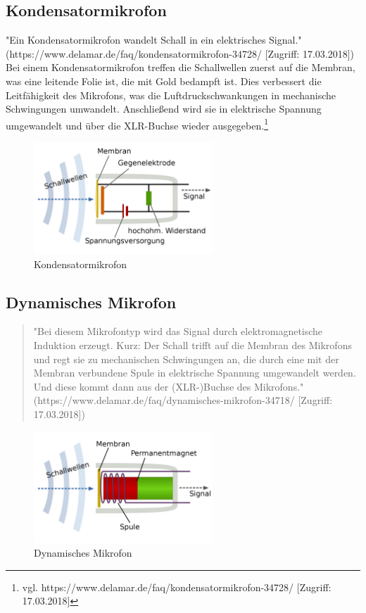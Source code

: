 \subsection{Kondensatormikrofon}
"Ein Kondensatormikrofon wandelt Schall in ein elektrisches Signal." (https://www.delamar.de/faq/kondensatormikrofon-34728/ [Zugriff: 17.03.2018])\newline
Bei einem Kondensatormikrofon treffen die Schallwellen zuerst auf die Membran, was eine leitende Folie ist, die mit Gold bedampft ist. Dies verbessert die  Leitfähigkeit des Mikrofons, was die Luftdruckschwankungen in mechanische Schwingungen umwandelt. Anschließend wird sie in elektrische Spannung umgewandelt und über die XLR-Buchse wieder ausgegeben.\footnote{\label{}vgl. https://www.delamar.de/faq/kondensatormikrofon-34728/ [Zugriff: 17.03.2018]}
\begin{figure}[H]
	\centering
	\includegraphics[width=0.6\textwidth]{abb8} 
	\caption[Kondensatormikrofon]{Kondensatormikrofon\footnotemark}
\end{figure}
\subsection{Dynamisches Mikrofon}
\begin{quote}
"Bei diesem Mikrofontyp wird das Signal durch elektromagnetische Induktion erzeugt. Kurz: Der Schall trifft auf die Membran des Mikrofons und regt sie zu mechanischen Schwingungen an, die durch eine mit der Membran verbundene Spule in elektrische Spannung umgewandelt werden. Und diese kommt dann aus der (XLR-)Buchse des Mikrofons." (https://www.delamar.de/faq/dynamisches-mikrofon-34718/ [Zugriff: 17.03.2018])
\end{quote} 
\begin{figure}[H]
	\centering
	\includegraphics[width=0.6\textwidth]{abb9} 
	\caption[Dynamisches Mikrofon]{Dynamisches Mikrofon\footnotemark}
\end{figure}
